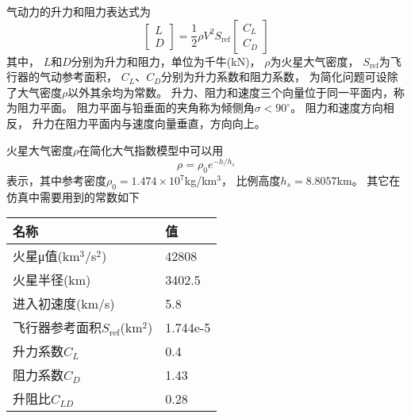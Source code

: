 气动力的升力和阻力表达式为
\begin{equation*}
    \left[\begin{matrix}
        L \\ D
    \end{matrix}\right]
    = \frac{1}{2}\rho V^2S_{\text{ref}}
    \left[\begin{matrix}
        C_L \\ C_D
    \end{matrix}\right]
\end{equation*}
其中，
$L$和$D$分别为升力和阻力，单位为千牛(kN)，
$\rho$为火星大气密度，
$S_{\text{ref}}$为飞行器的气动参考面积，
$C_L$、$C_D$分别为升力系数和阻力系数，
为简化问题可设除了大气密度$\rho$以外其余均为常数。
升力、阻力和速度三个向量位于同一平面内，称为阻力平面。
阻力平面与铅垂面的夹角称为倾侧角$\sigma<90^{\circ}$。
阻力和速度方向相反，
升力在阻力平面内与速度向量垂直，方向向上。

火星大气密度$\rho$在简化大气指数模型中可以用
\[\rho=\rho_0e^{-h/h_s}\]
表示，其中参考密度$\rho_0=1.474\times10^7$kg/km$^3$，
比例高度$h_s=8.8057$km。
其它在仿真中需要用到的常数如下 \\
\begin{center}\begin{tabular}{ll}
    \toprule
    名称 & 值 \\
    \midrule
    火星μ值(km$^3$/s$^2$) & 42808 \\
    火星半径(km) & 3402.5 \\
    进入初速度(km/s) & 5.8 \\
    飞行器参考面积$S_\text{ref}$(km$^2$) & 1.744e-5 \\
    升力系数$C_L$ & 0.4 \\
    阻力系数$C_D$ & 1.43 \\
    升阻比$C_{LD}$ & 0.28 \\
    \bottomrule
\end{tabular}\end{center}
